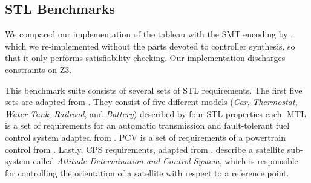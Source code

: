\documentclass[acmsmall,screen]{acmart}
\begin{document}
\subsection{STL Benchmarks}
\label{sec:stl-benchmarks}

We compared our implementation of the tableau with the SMT encoding by \citet{RamanDMMSS14},
which we re-implemented without the parts devoted to controller synthesis,
so that it only performs satisfiability checking.
Our implementation discharges constraints on Z3.

This benchmark suite consists of several sets of STL requirements.
The first five sets are adapted from \cite{BaeLee19}. %
They consist of five different models (\emph{Car}, \emph{Thermostat}, \emph{Water Tank}, \emph{Railroad}, and \emph{Battery}) described by four STL properties each.
MTL is a set of requirements for an automatic transmission and fault-tolerant fuel control system adapted from \cite{Benchmarks_Temporal_Logic_Requirements}.
PCV is a set of requirements of a powertrain control from \cite{pcv}.
Lastly, CPS requirements, adapted from \cite{BoufaiedJBBP21}, describe a satellite sub-system called \emph{Attitude Determination and Control System}, which is responsible for controlling the orientation of a satellite with respect to a reference point.
\end{document}

